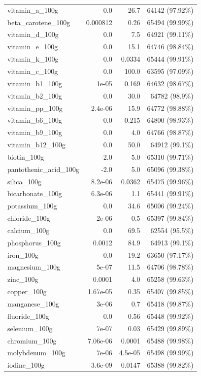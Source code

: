 \documentclass[11pt]{article}
\begin{document}
\begin{center}
\begin{longtable}{|l|r|r|r|}
vitamin\_a\_100g& 0.0& 26.7& 64142 (97.92\%)\\
beta\_carotene\_100g& 0.000812& 0.26& 65494 (99.99\%)\\
vitamin\_d\_100g& 0.0& 7.5& 64921 (99.11\%)\\
vitamin\_e\_100g& 0.0& 15.1& 64746 (98.84\%)\\
vitamin\_k\_100g& 0.0& 0.0334& 65444 (99.91\%)\\
vitamin\_c\_100g& 0.0& 100.0& 63595 (97.09\%)\\
vitamin\_b1\_100g& 1e-05& 0.169& 64632 (98.67\%)\\
vitamin\_b2\_100g& 0.0& 30.0& 64782 (98.9\%)\\
vitamin\_pp\_100g& 2.4e-06& 15.9& 64772 (98.88\%)\\
vitamin\_b6\_100g& 0.0& 0.215& 64800 (98.93\%)\\
vitamin\_b9\_100g& 0.0& 4.0& 64766 (98.87\%)\\
vitamin\_b12\_100g& 0.0& 50.0& 64912 (99.1\%)\\
biotin\_100g& -2.0& 5.0& 65310 (99.71\%)\\
pantothenic\_acid\_100g& -2.0& 5.0& 65096 (99.38\%)\\
silica\_100g& 8.2e-06& 0.0362& 65475 (99.96\%)\\
bicarbonate\_100g& 6.3e-06& 1.1& 65441 (99.91\%)\\
potassium\_100g& 0.0& 34.6& 65006 (99.24\%)\\
chloride\_100g& 2e-06& 0.5& 65397 (99.84\%)\\
calcium\_100g& 0.0& 69.5& 62554 (95.5\%)\\
phosphorus\_100g& 0.0012& 84.9& 64913 (99.1\%)\\
iron\_100g& 0.0& 19.2& 63650 (97.17\%)\\
magnesium\_100g& 5e-07& 11.5& 64706 (98.78\%)\\
zinc\_100g& 0.0001& 4.0& 65258 (99.63\%)\\
copper\_100g& 1.67e-05& 0.35& 65407 (99.85\%)\\
manganese\_100g& 3e-06& 0.7& 65418 (99.87\%)\\
fluoride\_100g& 0.0& 0.56& 65448 (99.92\%)\\
selenium\_100g& 7e-07& 0.03& 65429 (99.89\%)\\
chromium\_100g& 7.06e-06& 0.0001& 65488 (99.98\%)\\
molybdenum\_100g& 7e-06& 4.5e-05& 65498 (99.99\%)\\
iodine\_100g& 3.6e-09& 0.0147& 65388 (99.82\%)\\

\end{longtable}
\end{center}
\end{document}
